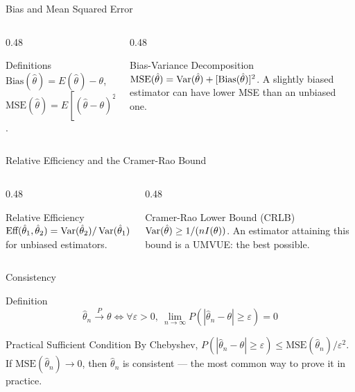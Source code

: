 \documentclass[aspectratio=169,xcolor={dvipsnames,table}]{beamer}
\begin{document}
\begin{frame}{Bias and Mean Squared Error}
	\vspace{-0.15cm}
	\begin{columns}[T]
		\begin{column}{0.48\textwidth}
			\begin{block}{Definitions}
				\footnotesize
				$\text{Bias}(\hat\theta) = E(\hat\theta)-\theta$, $\text{MSE}(\hat\theta) = E[(\hat\theta-\theta)^2]$.
			\end{block}
		\end{column}
		\begin{column}{0.48\textwidth}
			\begin{alertblock}{Bias-Variance Decomposition}
				\footnotesize
				$\text{MSE}(\hat\theta) = \operatorname{Var}(\hat\theta) + [\text{Bias}(\hat\theta)]^2$. A slightly biased estimator can have lower MSE than an unbiased one.
			\end{alertblock}
		\end{column}
	\end{columns}
\end{frame}

\begin{frame}{Relative Efficiency and the Cramer-Rao Bound}
	\vspace{-0.15cm}
	\begin{columns}[T]
		\begin{column}{0.48\textwidth}
			\begin{block}{Relative Efficiency}
				\footnotesize
				$\text{Eff}(\hat\theta_1,\hat\theta_2) = \operatorname{Var}(\hat\theta_2)/\operatorname{Var}(\hat\theta_1)$ for unbiased estimators.
			\end{block}
		\end{column}
		\begin{column}{0.48\textwidth}
			\begin{alertblock}{Cramer-Rao Lower Bound (CRLB)}
				\footnotesize
				$\operatorname{Var}(\hat\theta) \geq 1/(nI(\theta))$. An estimator attaining this bound is a UMVUE: the best possible.
			\end{alertblock}
		\end{column}
	\end{columns}
\end{frame}

\begin{frame}{Consistency}
	\vspace{-0.15cm}
	\begin{block}{Definition}
		$$\hat\theta_n \xrightarrow{P} \theta \iff \forall\varepsilon>0,\ \lim_{n\to\infty} P(|\hat\theta_n-\theta|\ge\varepsilon) = 0$$
	\end{block}
	\pause
	\vspace{0.1cm}
	\begin{alertblock}{Practical Sufficient Condition}
		By Chebyshev, $P(|\hat\theta_n-\theta|\ge\varepsilon) \le \text{MSE}(\hat\theta_n)/\varepsilon^2$. If $\text{MSE}(\hat\theta_n)\to 0$, then $\hat\theta_n$ is consistent --- the most common way to prove it in practice.
	\end{alertblock}
\end{frame}
\end{document}
